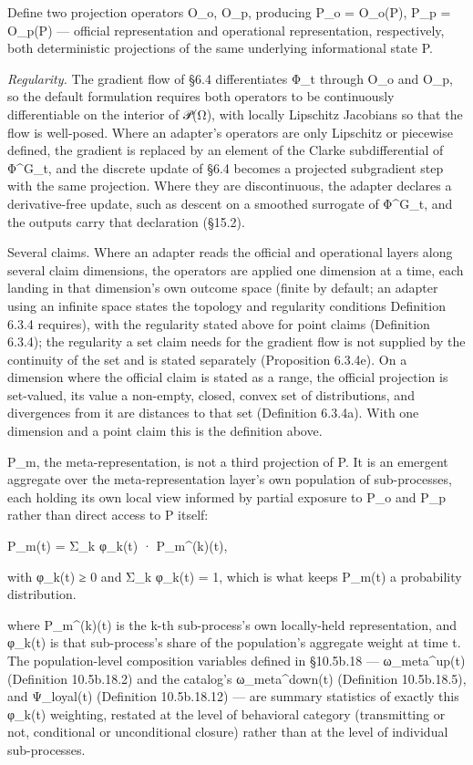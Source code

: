 \documentclass[
]{article}
\begin{document}
Define two projection operators O\_o, O\_p, producing P\_o = O\_o(P),
P\_p = O\_p(P) --- official representation and operational
representation, respectively, both deterministic projections of the same
underlying informational state P.

\emph{Regularity.} The gradient flow of §6.4 differentiates Φ\_t through
O\_o and O\_p, so the default formulation requires both operators to be
continuously differentiable on the interior of 𝒫(Ω), with locally
Lipschitz Jacobians so that the flow is well-posed. Where an adapter's
operators are only Lipschitz or piecewise defined, the gradient is
replaced by an element of the Clarke subdifferential of Φ\^{}G\_t, and
the discrete update of §6.4 becomes a projected subgradient step with
the same projection. Where they are discontinuous, the adapter declares
a derivative-free update, such as descent on a smoothed surrogate of
Φ\^{}G\_t, and the outputs carry that declaration (§15.2).

Several claims. Where an adapter reads the official and operational
layers along several claim dimensions, the operators are applied one
dimension at a time, each landing in that dimension's own outcome space
(finite by default; an adapter using an infinite space states the
topology and regularity conditions Definition 6.3.4 requires), with the
regularity stated above for point claims (Definition 6.3.4); the
regularity a set claim needs for the gradient flow is not supplied by
the continuity of the set and is stated separately (Proposition 6.3.4e).
On a dimension where the official claim is stated as a range, the
official projection is set-valued, its value a non-empty, closed, convex
set of distributions, and divergences from it are distances to that set
(Definition 6.3.4a). With one dimension and a point claim this is the
definition above.

P\_m, the meta-representation, is not a third projection of P. It is an
emergent aggregate over the meta-representation layer's own population
of sub-processes, each holding its own local view informed by partial
exposure to P\_o and P\_p rather than direct access to P itself:

P\_m(t) = Σ\_k φ\_k(t) · P\_m\^{}(k)(t),

with φ\_k(t) ≥ 0 and Σ\_k φ\_k(t) = 1, which is what keeps P\_m(t) a
probability distribution.

where P\_m\^{}(k)(t) is the k-th sub-process's own locally-held
representation, and φ\_k(t) is that sub-process's share of the
population's aggregate weight at time t. The population-level
composition variables defined in §10.5b.18 --- ω\_meta\^{}up(t)
(Definition 10.5b.18.2) and the catalog's ω\_meta\^{}down(t) (Definition
10.5b.18.5), and Ψ\_loyal(t) (Definition 10.5b.18.12) --- are summary
statistics of exactly this φ\_k(t) weighting, restated at the level of
behavioral category (transmitting or not, conditional or unconditional
closure) rather than at the level of individual sub-processes.
\end{document}
